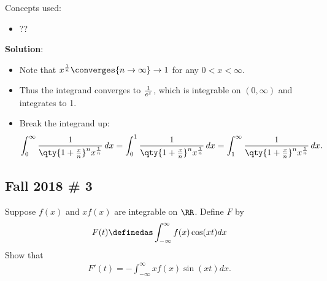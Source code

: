 \begin{solution}

Concepts used:

\begin{itemize}
\tightlist
\item
  ??
\end{itemize}

\textbf{Solution}:

\begin{itemize}
\tightlist
\item
  Note that \(x^{1\over n} \converges{n\to\infty}\to 1\) for any
  \(0 < x < \infty\).
\item
  Thus the integrand converges to \({1\over e^x}\), which is integrable
  on \((0, \infty)\) and integrates to 1.
\item
  Break the integrand up:
  \begin{align*}
  \int_0^\infty {1 \over  \qty{ 1 + {x\over n} }^n x^{1\over n}} \,dx
  = \int_0^1 {1 \over  \qty{ 1 + {x\over n} }^n x^{1\over n}} \,dx
  = \int_1^\infty {1 \over  \qty{ 1 + {x\over n} }^n x^{1\over n}} \,dx
  .\end{align*}
\end{itemize}

\end{solution}

\hypertarget{fall-2018-3}{%
\subsection{Fall 2018 \# 3}\label{fall-2018-3}}

Suppose \(f(x)\) and \(xf(x)\) are integrable on \(\RR\). Define \(F\)
by
\begin{align*}
F(t)\definedas \int _{-\infty}^{\infty} f(x) \cos (x t) dx
\end{align*} Show that
\begin{align*}
F'(t)=-\int _{-\infty}^{\infty} x f(x) \sin (x t) dx
.\end{align*}

